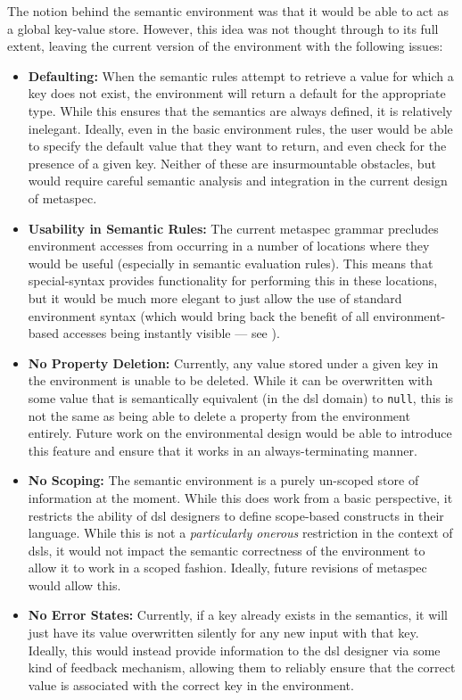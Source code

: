 The notion behind the semantic environment was that it would be able to act as a global key-value store. 
However, this idea was not thought through to its full extent, leaving the current version of the environment with the following issues:
\begin{itemize}
    \item \textbf{Defaulting:} When the semantic rules attempt to retrieve a value for which a key does not exist, the environment will return a default for the appropriate type. 
    While this ensures that the semantics are always defined, it is relatively inelegant. 
    Ideally, even in the basic environment rules, the user would be able to specify the default value that they want to return, and even check for the presence of a given key.
    Neither of these are insurmountable obstacles, but would require careful semantic analysis and integration in the current design of metaspec.
    \item \textbf{Usability in Semantic Rules:} The current metaspec grammar precludes environment accesses from occurring in a number of locations where they would be useful (especially in semantic evaluation rules).
    This means that special-syntax provides functionality for performing this in these locations, but it would be much more elegant to just allow the use of standard environment syntax (which would bring back the benefit of all environment-based accesses being instantly visible --- see ).
    \item \textbf{No Property Deletion:} Currently, any value stored under a given key in the environment is unable to be deleted.
    While it can be overwritten with some value that is semantically equivalent (in the \gls{dsl} domain) to \texttt{null}, this is not the same as being able to delete a property from the environment entirely.
    Future work on the environmental design would be able to introduce this feature and ensure that it works in an always-terminating manner. 
    \item \textbf{No Scoping:} The semantic environment is a purely un-scoped store of information at the moment.
    While this does work from a basic perspective, it restricts the ability of \gls{dsl} designers to define scope-based constructs in their language.
    While this is not a \textit{particularly onerous} restriction in the context of \glspl{dsl}, it would not impact the semantic correctness of the environment to allow it to work in a scoped fashion.
    Ideally, future revisions of \gls{metaspec} would allow this.
    \item \textbf{No Error States:} Currently, if a key already exists in the semantics, it will just have its value overwritten silently for any new input with that key.
    Ideally, this would instead provide information to the \gls{dsl} designer via some kind of feedback mechanism, allowing them to reliably ensure that the correct value is associated with the correct key in the environment.
\end{itemize}

